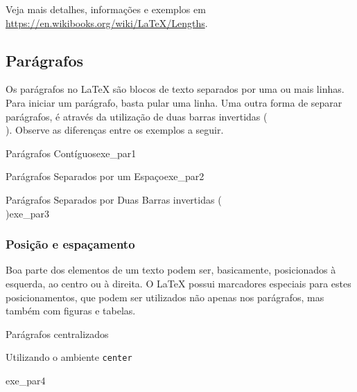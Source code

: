 \begin{marker}
Veja mais detalhes, informações e exemplos em \url{https://en.wikibooks.org/wiki/LaTeX/Lengths}.
\end{marker}

\subsection{Parágrafos}
\label{sec:paragrafos}

Os parágrafos no \LaTeX{} são blocos de texto separados por uma ou mais linhas. Para iniciar um parágrafo, basta pular uma linha. Uma outra forma de separar parágrafos, é através da utilização de duas barras invertidas (\texttt{\\}). Observe as diferenças entre os exemplos a seguir.

\begin{texexptitled}[breakable,enhanced,middle=2mm]{Parágrafos Contíguos}{exe_par1}
\lipsumsentence[1-4] 
\lipsumsentence[5-8]
\end{texexptitled}

\begin{texexptitled}[breakable,enhanced,middle=2mm]{Parágrafos Separados por um Espaço}{exe_par2}
\lipsumsentence[1-4]  

\lipsumsentence[5-8]
\end{texexptitled}

\begin{texexptitled}[breakable,enhanced,middle=2mm]{Parágrafos Separados por Duas Barras invertidas (\texttt{\\})}{exe_par3}
\lipsumsentence[1-4] \\ 
\lipsumsentence[5-8]
\end{texexptitled}

\subsubsection*{Posição e espaçamento}
\label{sec:pos_espac}

Boa parte dos elementos de um texto podem ser, basicamente, posicionados à esquerda, ao centro ou à direita. O \LaTeX{} possui marcadores especiais para estes posicionamentos, que podem ser utilizados não apenas nos parágrafos, mas também com figuras e tabelas.

\begin{texexptitled}[breakable,enhanced,middle=2mm]{Parágrafos centralizados \par Utilizando o ambiente \texttt{center}}{exe_par4}
\begin{center}
\lipsumsentence[9-10] \\ 
\lipsumsentence[11-12]
\end{center}
\end{texexptitled}

